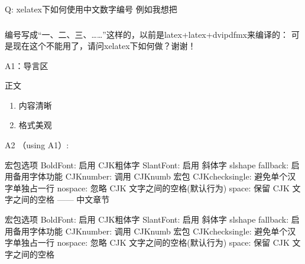 
Q: xelatex下如何使用中文数字编号
例如我想把\subsubsection{}编号写成“一、二、三、……”这样的，以前是latex+latex+dvipdfmx来编译的：
\renewcommand\thesubsubsection{\CJKnumber{\arabic{subsubsection}}、}
可是现在这个不能用了，请问xelatex下如何做？谢谢！

A1：导言区
\usepackage{enumitem}
\AddEnumerateCounter{\chinese}{\chinese}{}
正文
\begin{enumerate}[label={\chinese*、},labelsep=0pt]
  \item 内容清晰
  \item 格式美观
\end{enumerate}

A2 （using A1）:
\usepackage[Options] {xeCJK}
宏包选项
BoldFont:     启用 CJK粗体字
SlantFont:    启用 斜体字 slshape
fallback:      启用备用字体功能
CJKnumber:   调用 CJKnumb 宏包
CJKchecksingle: 避免单个汉字单独占一行
nospace:      忽略 CJK 文字之间的空格(默认行为)
space:        保留 CJK 文字之间的空格
------
中文章节
    \usepackage{titlesec}  
    \renewcommand{\chaptername}{第\CJKnumber{\thechapter}章}  
    \newcommand{\sectionname}{节}  
    \renewcommand{\figurename}{图}  
    \renewcommand{\tablename}{表}  
    \renewcommand{\bibname}{参考文献}  
    \renewcommand{\contentsname}{目~录}  
    \renewcommand{\listfigurename}{图~目~录}  
    \renewcommand{\listtablename}{表~目~录}  
    \renewcommand{\indexname}{索~引}  
    \renewcommand{\abstractname}{\Large{摘~要}}  
    \newcommand{\keywords}[1]{\\ \\ \textbf{关~键~词}：#1}  
    \titleformat{\chapter}[block]{\center\Large\bf}{\chaptername}{20pt}{}  
    \titleformat{\section}[block]{\large\bf}{\thesection}{10pt}{}  






\usepackage[Options] {xeCJK}
宏包选项
BoldFont:     启用 CJK粗体字
SlantFont:    启用 斜体字 slshape
fallback:      启用备用字体功能
CJKnumber:   调用 CJKnumb 宏包
CJKchecksingle: 避免单个汉字单独占一行
nospace:      忽略 CJK 文字之间的空格(默认行为)
space:        保留 CJK 文字之间的空格



